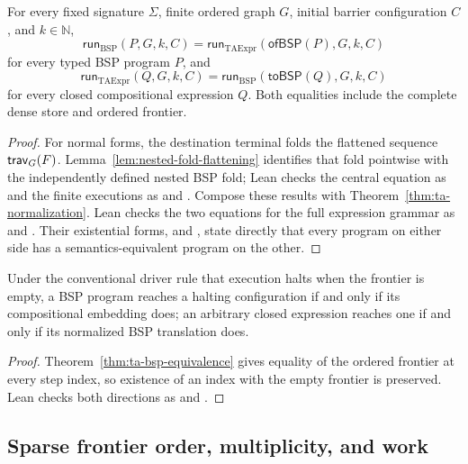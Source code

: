 \begin{theorem}
\label{thm:ta-bsp-equivalence}
For every fixed signature $\Sigma$, finite ordered graph $G$, initial barrier
configuration $C$, and $k\in\mathbb{N}$,
\[
 \mathsf{run}_{\mathrm{BSP}}(P,G,k,C)
 =\mathsf{run}_{\mathrm{TAExpr}}(\mathsf{ofBSP}(P),G,k,C)
\]
for every typed BSP program $P$, and
\[
 \mathsf{run}_{\mathrm{TAExpr}}(Q,G,k,C)
 =\mathsf{run}_{\mathrm{BSP}}(\mathsf{toBSP}(Q),G,k,C)
\]
for every closed compositional \TA{} expression $Q$.
Both equalities include the complete dense store and ordered frontier.
\end{theorem}

\begin{proof}
For normal forms, the \TA{} destination terminal folds the flattened sequence
$\mathsf{trav}_G(F)$.  Lemma~\ref{lem:nested-fold-flattening} identifies that fold
pointwise with the independently defined nested BSP fold; Lean checks the
central equation as  and the finite executions as
 and .  Compose these results
with Theorem~\ref{thm:ta-normalization}.  Lean checks the two equations for the
full expression grammar as  and
.  Their existential forms,
 and , state directly that
every program on either side has a semantics-equivalent program on the other.
\end{proof}

\begin{corollary}
Under the conventional driver rule that execution halts when the frontier is
empty, a BSP program reaches a halting configuration if and only if its
compositional \TA{} embedding does; an arbitrary closed \TA{} expression
reaches one if and only if its normalized BSP translation does.
\end{corollary}

\begin{proof}
Theorem~\ref{thm:ta-bsp-equivalence} gives equality of the ordered frontier at
every step index, so existence of an index with the empty frontier is
preserved.  Lean checks both directions as  and
.
\end{proof}

\subsection{Sparse frontier order, multiplicity, and work}

